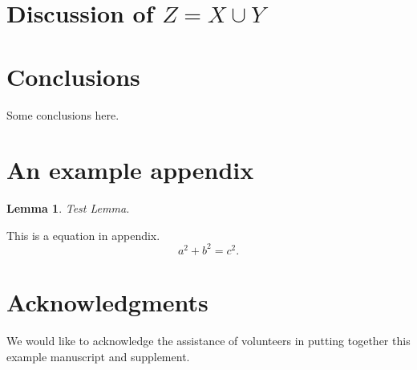 \documentclass[10pt,reqno,final]{amsart}
\numberwithin{equation}{section}
\numberwithin{figure}{section}
\numberwithin{table}{section}
\theoremstyle{plain}
\newtheorem{lemma}{Lemma}[section]
\theoremstyle{definition}
\theoremstyle{remark}
\begin{document}
\section{Discussion of \texorpdfstring{{\boldmath$Z=X \cup Y$}}{Z = X union Y}}

\lipsum[76]

\section{Conclusions}
\label{sec:conclusions}

Some conclusions here.


\appendix
\section{An example appendix}
\lipsum[71]

\begin{lemma}
Test Lemma.
\end{lemma}

This is a equation in appendix.
\begin{equation}\label{equ:A1}
  a^2+b^2=c^2.
\end{equation}

\section*{Acknowledgments}
We would like to acknowledge the assistance of volunteers in putting
together this example manuscript and supplement.



%


\end{document}
